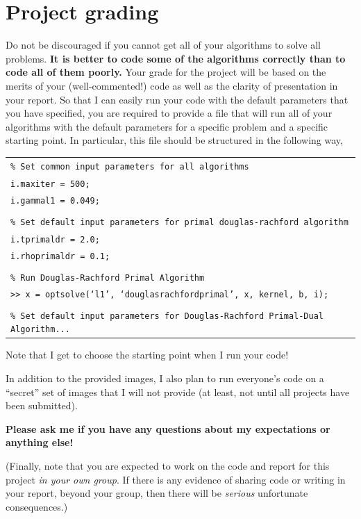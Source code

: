 \documentclass[12pt]{article}
\begin{document}
\section*{Project grading}

Do not be discouraged if you cannot get all of your algorithms to solve all problems.  \textbf{It is better to code some of the algorithms correctly than to code all of them poorly.}  Your grade for the project will be based on the merits of your (well-commented!)\! code as well as the clarity of presentation in your report.  So that I can easily run your code with the default parameters that you have specified, you are required to provide a file that will run all of your algorithms with the default parameters for a specific problem and a specific starting point.  In particular, this file should be structured in the following way, 
\begin{center}
  \begin{tabular}{l}
    \texttt{\% Set common input parameters for all algorithms}\\
    \texttt{i.maxiter = 500;}\\
    \texttt{i.gammal1 = 0.049;}\\
    \\
    \texttt{\% Set default input parameters for primal douglas-rachford algorithm}\\
    \texttt{i.tprimaldr = 2.0;}\\
    \texttt{i.rhoprimaldr = 0.1;}\\
    \\
    \texttt{\% Run Douglas-Rachford Primal Algorithm}\\
       \texttt{>> x = optsolve(`l1', `douglasrachfordprimal', x, kernel, b, i);}\\
    \\
    \texttt{\% Set default input parameters for Douglas-Rachford Primal-Dual Algorithm...}\\
  \end{tabular}
\end{center}
Note that I get to choose the starting point when I run your code!

\newpage

In addition to the provided images, I also plan to run everyone's code on a ``secret'' set of images that I will not provide (at least, not until all projects have been submitted).
\bigskip

\noindent
\textbf{Please ask me if you have any questions about my expectations or anything else!}
\bigskip

\noindent
\small
(Finally, note that you are expected to work on the code and report for this project \emph{in your own group}.  If there is any evidence of sharing code or writing in your report, beyond your group, then there will be \emph{serious} unfortunate consequences.)

\newpage


\end{document}
